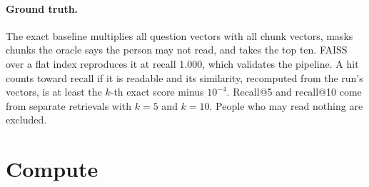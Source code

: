 \paragraph{Ground truth.}
The exact baseline multiplies all question vectors with all chunk vectors, masks chunks the oracle
says the person may not read, and takes the top ten. FAISS over a flat index reproduces it at recall
1.000, which validates the pipeline. A hit counts toward recall if it is readable and its similarity,
recomputed from the run's vectors, is at least the $k$-th exact score minus $10^{-4}$. Recall@5 and
recall@10 come from separate retrievals with $k = 5$ and $k = 10$. People who may read nothing are
excluded.

\section{Compute}\label{app:compute}

